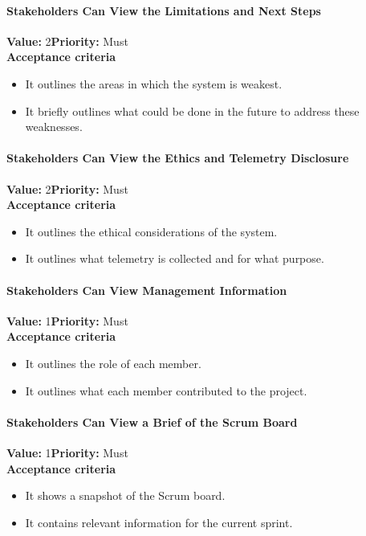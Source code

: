 \paragraph{Stakeholders Can View the Limitations and Next Steps}
\textbf{Value:} 2\quad \textbf{Priority:} Must\\
\textbf{Acceptance criteria}
\begin{itemize}
  \item It outlines the areas in which the system is weakest.
  \item It briefly outlines what could be done in the future to address these weaknesses.
\end{itemize}

\paragraph{Stakeholders Can View the Ethics and Telemetry Disclosure}
\textbf{Value:} 2\quad \textbf{Priority:} Must\\
\textbf{Acceptance criteria}
\begin{itemize}
  \item It outlines the ethical considerations of the system.
  \item It outlines what telemetry is collected and for what purpose.
\end{itemize}

\paragraph{Stakeholders Can View Management Information}
\textbf{Value:} 1\quad \textbf{Priority:} Must\\
\textbf{Acceptance criteria}
\begin{itemize}
  \item It outlines the role of each member.
  \item It outlines what each member contributed to the project.
\end{itemize}

\paragraph{Stakeholders Can View a Brief of the Scrum Board}
\textbf{Value:} 1\quad \textbf{Priority:} Must\\
\textbf{Acceptance criteria}
\begin{itemize}
  \item It shows a snapshot of the Scrum board.
  \item It contains relevant information for the current sprint.
\end{itemize}

